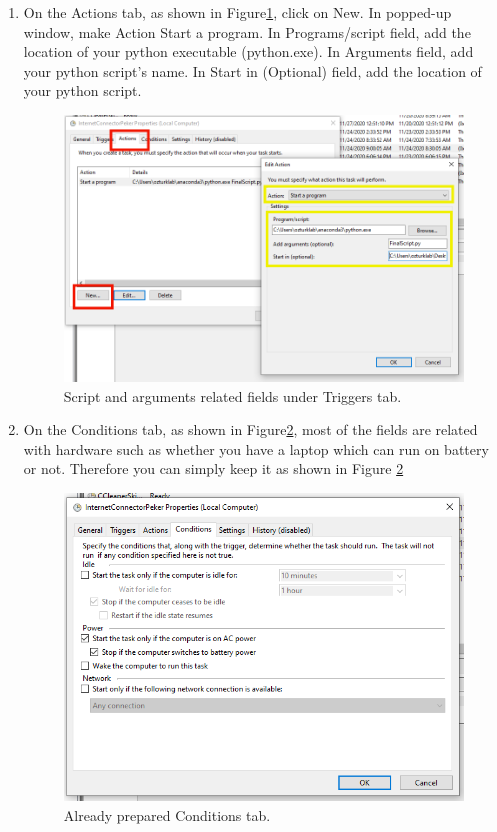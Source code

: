 \begin{enumerate}
 \item On the Actions tab, as shown in Figure\ref{fig:TaskAction}, click on New. In 
 popped-up window, make Action Start a program. In Programs/script field, add the 
 location of your python executable (python.exe). In Arguments field, add your python
 script's name. In Start in (Optional) field, add the location of your python script.
	\begin{figure}[H]
		\centering
		\includegraphics[angle=0,origin=c,width = .8\linewidth]{Section_Ethernet/Figures/TaskCreationAction.png}
		\caption{Script and arguments related fields under Triggers tab.}
		\label{fig:TaskAction}
	\end{figure}

 \item On the Conditions tab, as shown in Figure\ref{fig:TaskConditions}, most of 
 the fields are related with hardware such as whether you have a laptop which can
 run on battery or not. Therefore you can simply keep it as shown in Figure
 \ref{fig:TaskConditions}
	\begin{figure}[H]
		\centering
		\includegraphics[angle=0,origin=c,width = .8\linewidth]{Section_Ethernet/Figures/TaskCreationConditions.png}
		\caption{Already prepared Conditions tab.}
		\label{fig:TaskConditions}
	\end{figure}


\end{enumerate}

